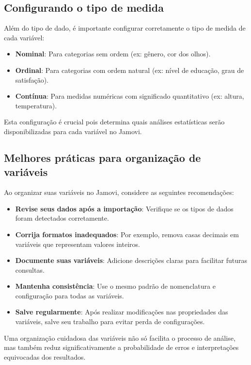 \subsection{Configurando o tipo de medida}

Além do tipo de dado, é importante configurar corretamente o tipo de medida de cada variável:

\begin{itemize}
    \item \textbf{Nominal}: Para categorias sem ordem (ex: gênero, cor dos olhos).
    \item \textbf{Ordinal}: Para categorias com ordem natural (ex: nível de educação, grau de satisfação).
    \item \textbf{Contínua}: Para medidas numéricas com significado quantitativo (ex: altura, temperatura).
\end{itemize}

Esta configuração é crucial pois determina quais análises estatísticas serão disponibilizadas para cada variável no Jamovi.

\subsection{Melhores práticas para organização de variáveis}

Ao organizar suas variáveis no Jamovi, considere as seguintes recomendações:

\begin{itemize}
    \item \textbf{Revise seus dados após a importação}: Verifique se os tipos de dados foram detectados corretamente.
    \item \textbf{Corrija formatos inadequados}: Por exemplo, remova casas decimais em variáveis que representam valores inteiros.
    \item \textbf{Documente suas variáveis}: Adicione descrições claras para facilitar futuras consultas.
    \item \textbf{Mantenha consistência}: Use o mesmo padrão de nomenclatura e configuração para todas as variáveis.
    \item \textbf{Salve regularmente}: Após realizar modificações nas propriedades das variáveis, salve seu trabalho para evitar perda de configurações.
\end{itemize}

Uma organização cuidadosa das variáveis não só facilita o processo de análise, mas também reduz significativamente a probabilidade de erros e interpretações equivocadas dos resultados.

